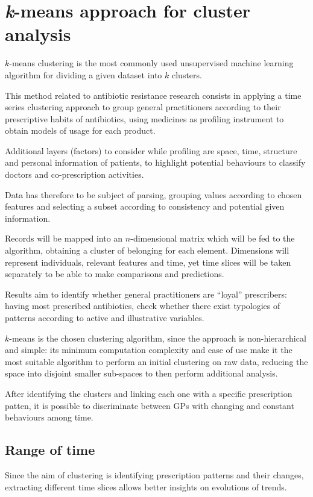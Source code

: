 \chapter[k-means]{\textit{k}-means approach for cluster analysis}
$k$-means clustering is the most commonly used unsupervised machine learning algorithm for dividing a given dataset into $k$ clusters. 

This method related to antibiotic resistance research consists in applying a time series clustering approach to group general practitioners according to their prescriptive habits of antibiotics, using medicines as profiling instrument to obtain models of usage for each product.

Additional layers (factors) to consider while profiling are space, time, structure and personal information of patients, to highlight potential behaviours to classify doctors and co-prescription activities. 

Data has therefore to be subject of parsing, grouping values according to chosen features and selecting a subset according to consistency and potential given information. 

Records will be mapped into an $n$-dimensional matrix which will be fed to the algorithm, obtaining a cluster of belonging for each element. Dimensions will represent individuals, relevant features and time, yet time slices will be taken separately to be able to make comparisons and predictions. 

Results aim to identify whether general practitioners are ``loyal'' prescribers: having most prescribed antibiotics, check whether there exist typologies of patterns according to active and illustrative variables. 

$k$-means is the chosen clustering algorithm, since the approach is non-hierarchical and simple: its minimum computation complexity and ease of use make it the most suitable algorithm to perform an initial clustering on raw data, reducing the space into disjoint smaller sub-spaces to then perform additional analysis.

After identifying the clusters and linking each one with a specific prescription patten, it is possible to discriminate between GPs with changing and constant behaviours among time.

\section{Range of time}
Since the aim of clustering is identifying prescription patterns and their changes, extracting different time slices allows better insights on evolutions of trends.

